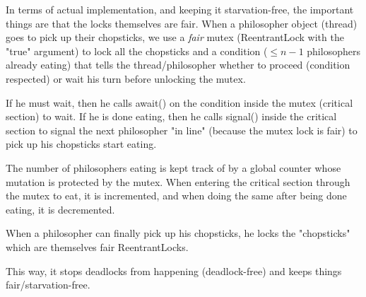 \documentclass[11pt,letterpaper]{exam}
\begin{document}
\begin{questions}
		In terms of actual implementation, and keeping it starvation-free, the important things are that the locks themselves are fair. When a philosopher object (thread) goes to pick up their chopsticks, we use a \textit{fair} mutex (ReentrantLock with the "true" argument) to lock all the chopsticks and a condition ($\le n-1$ philosophers already eating) that tells the thread/philosopher whether to proceed (condition respected) or wait his turn before unlocking the mutex.

		If he must wait, then he calls await() on the condition inside the mutex (critical section) to wait.
		If he is done eating, then he calls signal() inside the critical section to signal the next philosopher "in line" (because the mutex lock is fair) to pick up his chopsticks start eating.

		The number of philosophers eating is kept track of by a global counter whose mutation is protected by the mutex.
		When entering the critical section through the mutex to eat, it is incremented, and when doing the same after being done eating, it is decremented.

		When a philosopher can finally pick up his chopsticks, he locks the "chopsticks" which are themselves fair ReentrantLocks.

		This way, it stops deadlocks from happening (deadlock-free) and keeps things fair/starvation-free.


\end{questions}
\end{document}
